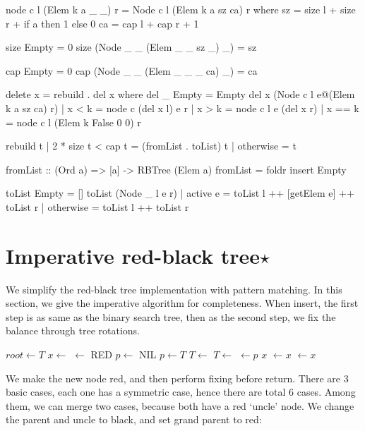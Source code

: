 \documentclass[b5paper]{article}
\begin{document}
\begin{Answer}[ref = {ex:mark-rebuild}]
{\begin{Haskell}
node c l (Elem k a _ _) r = Node c l (Elem k a sz ca) r where
  sz = size l + size r + if a then 1 else 0
  ca = cap l + cap r + 1

size Empty = 0
size (Node _ _ (Elem _ _ sz _) _) = sz

cap Empty = 0
cap (Node _ _ (Elem _ _ _ ca) _) = ca

delete x = rebuild . del x where
  del _ Empty = Empty
  del x (Node c l e@(Elem k a sz ca) r)
    | x < k = node c (del x l) e r
    | x > k = node c l e (del x r)
    | x == k = node c l (Elem k False 0 0) r

rebuild t | 2 * size t < cap t = (fromList . toList) t
          | otherwise = t

fromList :: (Ord a) => [a] -> RBTree (Elem a)
fromList = foldr insert Empty

toList Empty = []
toList (Node _ l e r) | active e = toList l ++ [getElem e] ++ toList r
                      | otherwise = toList l ++ toList r
\end{Haskell}
}
\end{Answer}

\section{Imperative red-black tree$\star$}

We simplify the red-black tree implementation with pattern matching. In this section, we give the imperative algorithm for completeness. When insert, the first step is as same as the binary search tree, then as the second step, we fix the balance through tree rotations.

\begin{algorithmic}[1]
  \State $root \gets T$
  \State $x \gets$ 
  \State {} $\gets$ RED
  \State $p \gets$ NIL
    \State $p \gets T$
      \State $T \gets $ 
    \Else
      \State $T \gets $ 
    \EndIf
  \EndWhile
  \State {} $\gets p$
   
    \State \Return $x$
    \State {} $\gets x$
  \Else
    \State {} $\gets x$
  \EndIf
  \State \Return {}
\EndFunction
\end{algorithmic}

We make the new node red, and then perform fixing before return. There are 3 basic cases, each one has a symmetric case, hence there are total 6 cases. Among them, we can merge two cases, because both have a red `uncle' node. We change the parent and uncle to black, and set grand parent to red:
\end{document}
